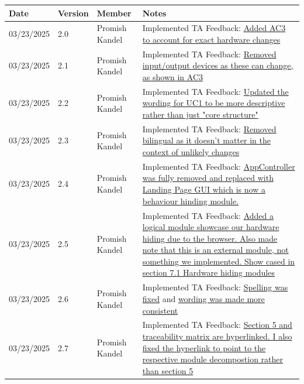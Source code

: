 \documentclass[12pt, titlepage]{article}
\begin{document}
  \begin{tabularx}{\textwidth}{p{3cm}p{2cm}p{3cm}X}
    \toprule {\bf Date} & {\bf Version} & {\bf Member} & {\bf Notes}\\
    \midrule
  03/23/2025 & 2.0 & Promish Kandel & Implemented TA Feedback: \href{https://github.com/parishanizam/TeleHealth/issues/498}{Added AC3 to account for exact hardware changes}\\
  03/23/2025 & 2.1 & Promish Kandel & Implemented TA Feedback: \href{https://github.com/parishanizam/TeleHealth/issues/499}{Removed input/output devices as these can change, as shown in AC3}\\
  03/23/2025 & 2.2 & Promish Kandel & Implemented TA Feedback: \href{https://github.com/parishanizam/TeleHealth/issues/500}{Updated the wording for UC1 to be more descriptive rather than just "core structure"}\\
  03/23/2025 & 2.3 & Promish Kandel & Implemented TA Feedback: \href{https://github.com/parishanizam/TeleHealth/issues/501}{Removed bilingual as it doesn't matter in the context of unlikely changes}\\
  03/23/2025 & 2.4 & Promish Kandel & Implemented TA Feedback: \href{https://github.com/parishanizam/TeleHealth/issues/502}{AppController was fully removed and replaced with Landing Page GUI which is now a behaviour hinding module.}\\
  03/23/2025 & 2.5 & Promish Kandel & Implemented TA Feedback: \href{https://github.com/parishanizam/TeleHealth/issues/504}{Added a logical module showcase our hardware hiding due to the browser. Also made note that this is an external module, not something we implemented. Show cased in section 7.1 Hardware hiding modules}\\
  03/23/2025 & 2.6 & Promish Kandel & Implemented TA Feedback: \href{https://github.com/parishanizam/TeleHealth/issues/505}{Spelling was fixed} and \href{https://github.com/parishanizam/TeleHealth/issues/506}{wording was made more consistent}\\
  03/23/2025 & 2.7 & Promish Kandel & Implemented TA Feedback: \href{https://github.com/parishanizam/TeleHealth/issues/507}{Section 5 and traceability matrix are hyperlinked. I also fixed the hyperlink to point to the respective module decompostion rather than section 5}\\
  \bottomrule
\end{tabularx}
\end{document}
